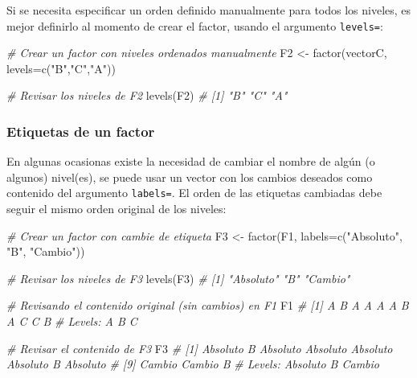 \documentclass[
]{article}
\newenvironment{Shaded}{\begin{snugshade}}{\end{snugshade}}
\newcommand{\AttributeTok}[1]{\textcolor[rgb]{0.77,0.63,0.00}{#1}}
\newcommand{\CommentTok}[1]{\textcolor[rgb]{0.56,0.35,0.01}{\textit{#1}}}
\newcommand{\FunctionTok}[1]{\textcolor[rgb]{0.00,0.00,0.00}{#1}}
\newcommand{\NormalTok}[1]{#1}
\newcommand{\OtherTok}[1]{\textcolor[rgb]{0.56,0.35,0.01}{#1}}
\newcommand{\StringTok}[1]{\textcolor[rgb]{0.31,0.60,0.02}{#1}}
\theoremstyle{definition}
\theoremstyle{definition}
\theoremstyle{definition}
\theoremstyle{definition}
\theoremstyle{remark}
\begin{document}
Si se necesita especificar un orden definido manualmente para todos los niveles, es mejor definirlo al momento de crear el factor, usando el argumento \texttt{levels=}:

\begin{Shaded}
\begin{Highlighting}[]
\CommentTok{\# Crear un factor con niveles ordenados manualmente}
\NormalTok{F2 }\OtherTok{\textless{}{-}} \FunctionTok{factor}\NormalTok{(vectorC, }\AttributeTok{levels=}\FunctionTok{c}\NormalTok{(}\StringTok{"B"}\NormalTok{,}\StringTok{"C"}\NormalTok{,}\StringTok{"A"}\NormalTok{))}

\CommentTok{\# Revisar los niveles de F2}
\FunctionTok{levels}\NormalTok{(F2)}
\CommentTok{\# [1] "B" "C" "A"}
\end{Highlighting}
\end{Shaded}

\hypertarget{etiquetas-de-un-factor}{%
\subsubsection{Etiquetas de un factor}\label{etiquetas-de-un-factor}}

En algunas ocasionas existe la necesidad de cambiar el nombre de algún (o algunos) nivel(es), se puede usar un vector con los cambios deseados como contenido del argumento \texttt{labels=}. El orden de las etiquetas cambiadas debe seguir el mismo orden original de los niveles:

\begin{Shaded}
\begin{Highlighting}[]
\CommentTok{\# Crear un factor con cambie de etiqueta}
\NormalTok{F3 }\OtherTok{\textless{}{-}} \FunctionTok{factor}\NormalTok{(F1, }\AttributeTok{labels=}\FunctionTok{c}\NormalTok{(}\StringTok{"Absoluto"}\NormalTok{, }\StringTok{"B"}\NormalTok{, }\StringTok{"Cambio"}\NormalTok{))}

\CommentTok{\# Revisar los niveles de F3}
\FunctionTok{levels}\NormalTok{(F3)}
\CommentTok{\# [1] "Absoluto" "B"        "Cambio"}

\CommentTok{\# Revisando el contenido original (sin cambios) en F1}
\NormalTok{F1}
\CommentTok{\#  [1] A B A A A A B A C C B}
\CommentTok{\# Levels: A B C}

\CommentTok{\# Revisar el contenido de F3}
\NormalTok{F3}
\CommentTok{\#  [1] Absoluto B        Absoluto Absoluto Absoluto Absoluto B        Absoluto}
\CommentTok{\#  [9] Cambio   Cambio   B       }
\CommentTok{\# Levels: Absoluto B Cambio}
\end{Highlighting}
\end{Shaded}
\end{document}
